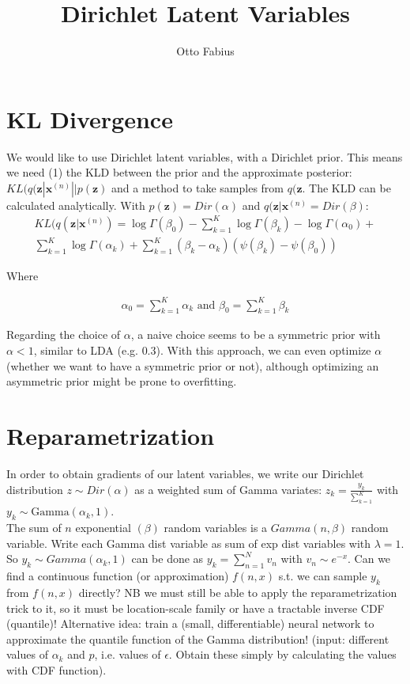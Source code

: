 \documentclass{article}
\author{Otto Fabius}
\title{Dirichlet Latent Variables}
\begin{document}
\maketitle

\section{KL Divergence}

We would like to use Dirichlet latent variables, with a Dirichlet prior. This means we need (1) the KLD between the prior and the approximate posterior: $KL(q(\mathbf{z}|\mathbf{x}^{(n)}||p(\mathbf{z})$ and a method to take samples from $q(\mathbf{z}$. The KLD can be calculated analytically.
With $p(\mathbf{z}) = Dir(\alpha)$ and $q(\mathbf{z}|\mathbf{x}^{(n)} = Dir(\beta)$:
\begin{align}
KL(q(\mathbf{z}|\mathbf{x}^{(n)}) = \log \Gamma(\beta_0) - \sum_{k=1}^K\log\Gamma(\beta_k)-\log\Gamma(\alpha_0)+ \\
\sum_{k=1}^K\log\Gamma(\alpha_k)+ \sum_{k=1}^K(\beta_k - \alpha_k)(\psi(\beta_k)-\psi(\beta_0))
\end{align}

Where

\begin{align}
\alpha_0 = \sum_{k=1}^{K}\alpha_k \text{ and } \beta_0 = \sum_{k=1}^{K}\beta_k
\end{align}

Regarding the choice of $\alpha$, a naive choice seems to be a symmetric prior with $\alpha < 1$, similar to LDA (e.g. $0.3$). With this approach, we can even optimize $\alpha$ (whether we want to have a symmetric prior or not), although optimizing an asymmetric prior might be prone to overfitting.

\section{Reparametrization}

In order to obtain gradients of our latent variables, we write our Dirichlet distribution $z \sim Dir(\alpha)$ as a weighted sum of Gamma variates: $z_k = \frac{y_k}{\sum_{k=1}^{K}}$ with $y_k \sim \text{Gamma}(\alpha_k,1)$. \\
The sum of $n$  exponential $(\beta)$ random variables is a $Gamma(n, \beta)$ random variable. Write each Gamma dist variable as sum of exp dist variables with $\lambda = 1$. So $y_k \sim Gamma(\alpha_k,1)$ can be done as $y_k = \sum_{n=1}^{N}v_n$ with $v_n \sim e^{-x}$. Can we find a continuous function (or approximation) $f(n,x)$ s.t. we can sample $y_k$ from $f(n,x)$ directly? NB we must still be able to apply the reparametrization trick to it, so it must be location-scale family or have a tractable inverse CDF (quantile)! Alternative idea: train a (small, differentiable) neural network to approximate the quantile function of the Gamma distribution! (input: different values of $\alpha_k$  and $p$, i.e. values of $\epsilon$. Obtain these simply by calculating the values with CDF function).
\end{document}
